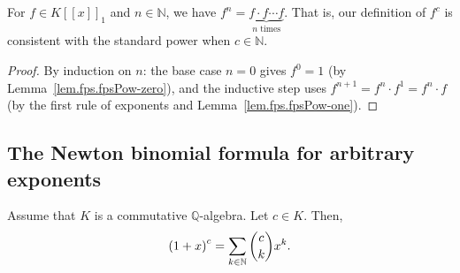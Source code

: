 \begin{lemma}
\label{lem.fps.fpsPow-nat}
\leanhelper
\leanok
For $f\in K[[x]]_1$ and $n\in\mathbb{N}$, we have
$f^n = \underbrace{f\cdot f\cdots f}_{n\text{ times}}$.
That is, our definition of $f^c$ is consistent with the standard power when $c\in\mathbb{N}$.
\end{lemma}

\begin{proof}
\leanok
By induction on $n$:
the base case $n=0$ gives $f^0=1$ (by Lemma~\ref{lem.fps.fpsPow-zero}),
and the inductive step uses $f^{n+1} = f^n\cdot f^1 = f^n\cdot f$
(by the first rule of exponents and Lemma~\ref{lem.fps.fpsPow-one}).
\end{proof}

\subsection{The Newton binomial formula for arbitrary exponents}

\begin{theorem}
\label{thm.fps.gen-newton}
\leantarget
\leanok
Assume that $K$
is a commutative $\mathbb{Q}$-algebra. Let $c\in K$. Then,%
\[
\left(  1+x\right)  ^{c}=\sum_{k\in\mathbb{N}}\dbinom{c}{k}x^{k}.
\]
\end{theorem}

